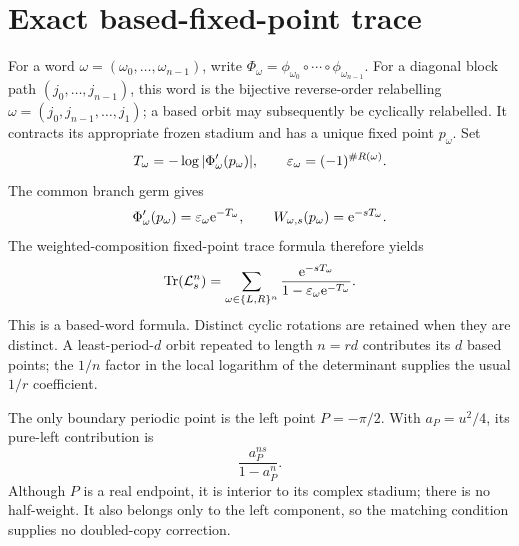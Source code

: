 \section{Exact based-fixed-point trace}
For a word \(\omega=(\omega_0,\ldots,\omega_{n-1})\), write
\(\Phi_\omega=\phi_{\omega_0}\circ\cdots\circ\phi_{\omega_{n-1}}\).
For a diagonal block path \((j_0,\ldots,j_{n-1})\), this word is the
bijective reverse-order relabelling
\(\omega=(j_0,j_{n-1},\ldots,j_1)\); a based orbit may subsequently be
cyclically relabelled.
It contracts its appropriate frozen stadium and has a unique fixed point
\(p_\omega\). Set
\[
 T_\omega=-\log|\Phi_\omega'(p_\omega)|,
 \qquad \varepsilon_\omega=(-1)^{\#R(\omega)}.
\]
The common branch germ gives
\[
 \Phi_\omega'(p_\omega)=\varepsilon_\omega\mathrm{e}^{-T_\omega},
 \qquad W_{\omega,s}(p_\omega)=\mathrm{e}^{-sT_\omega}.
\]
The weighted-composition fixed-point trace formula therefore yields
\[
 \operatorname{Tr}(\mathcal{L}_s^n)=
 \sum_{\omega\in\{L,R\}^n}
 \frac{\mathrm{e}^{-sT_\omega}}
 {1-\varepsilon_\omega\mathrm{e}^{-T_\omega}}.
\]
This is a based-word formula. Distinct cyclic rotations are retained when
they are distinct. A least-period-\(d\) orbit repeated to length \(n=rd\)
contributes its \(d\) based points; the \(1/n\) factor in the local logarithm
of the determinant supplies the usual \(1/r\) coefficient.

The only boundary periodic point is the left point \(P=-\pi/2\). With
\(a_P=u^2/4\), its pure-left contribution is
\[
 \frac{a_P^{ns}}{1-a_P^n}.
\]
Although \(P\) is a real endpoint, it is interior to its complex stadium;
there is no half-weight. It also belongs only to the left component, so the
matching condition supplies no doubled-copy correction.
